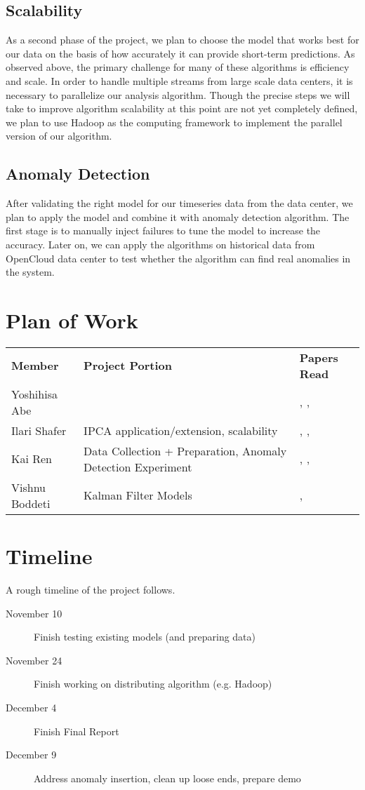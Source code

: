 \subsection{Scalability}
\label{sec:method:scale}
As a second phase of the project, we plan to choose the model that works best for our data on the basis of how accurately it can provide short-term predictions. As observed above, the primary challenge for many of these algorithms is efficiency and scale. In order to handle multiple streams from large scale data centers, it is necessary to parallelize our analysis algorithm. Though the precise steps we will take to improve algorithm scalability at this point are not yet completely defined, we plan to use Hadoop as the computing framework to implement the parallel version of our algorithm.  
 
\subsection{Anomaly Detection}
\label{sec:method:anomaly}
After validating the right model for our timeseries data from the data center, we plan to apply the model and combine it with anomaly detection algorithm. The first stage is to manually inject failures to tune the model to increase the accuracy. Later on, we can apply the algorithms on historical data from OpenCloud data center to test whether the algorithm can find real anomalies in the system.

\section{Plan of Work}
\begin{tabular}{lll}
\bf Member & \bf Project Portion & \bf Papers Read \\
Yoshihisa Abe & & \cite{Zhu2002}, \cite{Zhu2003}, \cite{Sakurai2011} \\
Ilari Shafer & IPCA application/extension, scalability & \cite{Li2009}, \cite{Gmach2007}, \cite{Lavrenko2000} \\
Kai Ren & Data Collection + Preparation, Anomaly Detection Experiment &  \cite{xu2009}, \cite{Xu}, \cite{nguyen2011} \\
Vishnu Boddeti & Kalman Filter Models & \cite{Papadimitriou2005}, \cite{Roweis1999}
\end{tabular}

\section{Timeline}
\label{sec:timeline}
A rough timeline of the project follows.
\begin{description}
\item[November 10] Finish testing existing models (and preparing data)
\item[November 24] Finish working on distributing algorithm (e.g. Hadoop)
\item[December 4] Finish Final Report
\item[December 9] Address anomaly insertion, clean up loose ends, prepare demo
\end{description}



\newpage
{}


